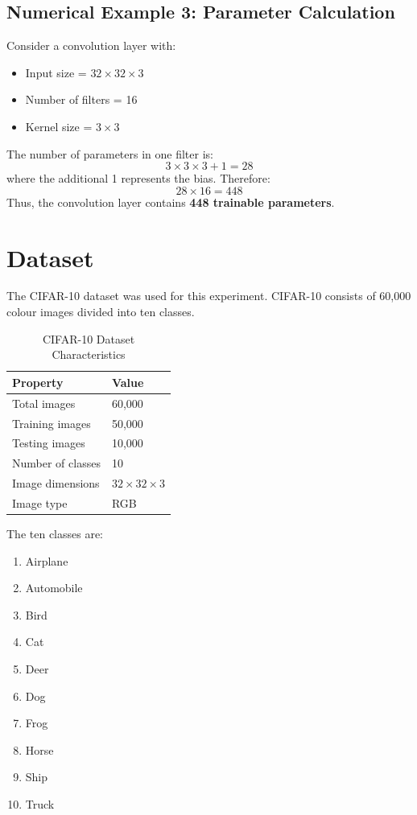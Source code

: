 \documentclass[11pt]{article}
\begin{document}
\subsection{Numerical Example 3: Parameter Calculation}
Consider a convolution layer with:
\begin{itemize}
    \item Input size = $32 \times 32 \times 3$
    \item Number of filters = 16
    \item Kernel size = $3 \times 3$
\end{itemize}
The number of parameters in one filter is:
\[
3 \times 3 \times 3 + 1 = 28
\]
where the additional 1 represents the bias. Therefore:
\[
28 \times 16 = 448
\]
Thus, the convolution layer contains \textbf{448 trainable parameters}.

\section{Dataset}
The CIFAR-10 dataset was used for this experiment. CIFAR-10 consists of 60,000 colour images divided into ten classes.

\begin{table}[h]
\centering
\caption{CIFAR-10 Dataset Characteristics}
\begin{tabular}{|l|l|}
\hline
\textbf{Property} & \textbf{Value} \\
\hline
Total images & 60,000 \\
Training images & 50,000 \\
Testing images & 10,000 \\
Number of classes & 10 \\
Image dimensions & $32 \times 32 \times 3$ \\
Image type & RGB \\
\hline
\end{tabular}
\end{table}

The ten classes are:
\begin{enumerate}
    \item Airplane
    \item Automobile
    \item Bird
    \item Cat
    \item Deer
    \item Dog
    \item Frog
    \item Horse
    \item Ship
    \item Truck
\end{enumerate}
\end{document}

